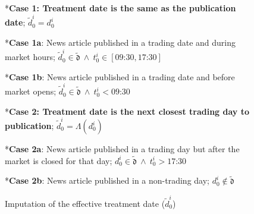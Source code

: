 \begin{figure}[H]
\caption{Imputation of the effective treatment date ($\tilde d_0^i$)}
\label{fig:trading-timelines}


*{\textbf{Case 1: Treatment date is the same as the publication date};  $\tilde d_0^i = d_0^i$}

\begin{minipage}{0.44\textwidth}
\centering
{}*{\textbf{Case 1a}: News article published in a trading date and during market hours;  $\tilde d_0^i \in \tilde{\mathfrak d} ~\wedge~ t_0^i \in [\text{09:30}, \text{17:30}]$}

\end{minipage}
\hfill
\begin{minipage}{0.44\textwidth}
\centering
{}*{\textbf{Case 1b}: News article published in a trading date and before market opens;  $\tilde d_0^i \in \tilde{\mathfrak d} ~\wedge~ t_0^i < \text{09:30}$}

\end{minipage}

\vspace{0.5cm}

*{\textbf{Case 2: Treatment date is the next closest trading day to publication}; $\tilde d_0^i = \Lambda(d_0^i)$}  

\begin{minipage}{0.48\textwidth}
\centering
{}*{\textbf{Case 2a}: News article published in a trading day but after the market is closed for that day; $d_0^i\in \tilde{\mathfrak d} ~\wedge~ t_0^i>\text{17:30}  $}  

\end{minipage}
\hfill
\begin{minipage}{0.45\textwidth}
\centering
{}*{\textbf{Case 2b}: News article  published in a non-trading day; $d_0^i\not \in \tilde{\mathfrak d}$}  

\end{minipage}


\end{figure}